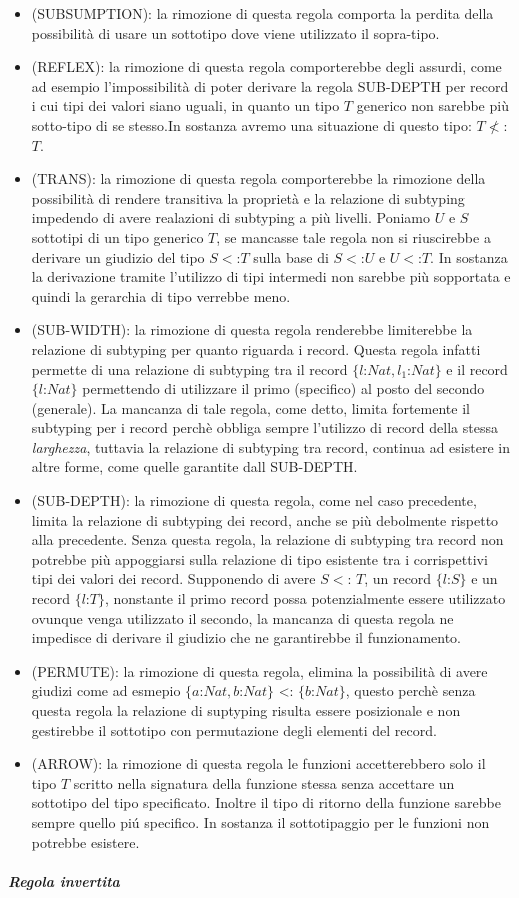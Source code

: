 \begin{itemize}
\item (SUBSUMPTION): la rimozione di questa regola comporta la perdita della possibilit\`a di usare un sottotipo dove viene utilizzato il sopra-tipo.
\item (REFLEX): la rimozione di questa regola comporterebbe degli assurdi, come ad esempio l'impossibilit\`a di poter derivare la regola SUB-DEPTH per record i cui tipi dei valori siano uguali, in quanto un tipo $T$ generico non sarebbe pi\`u sotto-tipo di se stesso.In sostanza avremo una situazione di questo tipo: $T \not <$: $T$.
\item (TRANS):  la rimozione di questa regola comporterebbe la rimozione della possibilit\`a di rendere transitiva la propriet\`a e la relazione di subtyping impedendo di avere realazioni di subtyping a pi\`u livelli. Poniamo $U$ e $S$ sottotipi di un tipo generico $T$, se mancasse tale regola non si riuscirebbe a derivare un giudizio del tipo $S<$:$T$ sulla base di $S <$:$U$ e $U<$:$T$. In sostanza la derivazione tramite l'utilizzo di tipi intermedi non sarebbe pi\`u sopportata e quindi la gerarchia di tipo verrebbe meno.
\item (SUB-WIDTH):
la rimozione di questa regola renderebbe limiterebbe la relazione di subtyping per quanto riguarda i record. Questa regola infatti permette di una relazione di subtyping tra il record $\{l$:$Nat,l_1$:$Nat\}$ e il record $\{l$:$Nat\}$ permettendo di utilizzare il primo (specifico) al posto del secondo (generale). La mancanza di tale regola, come detto, limita fortemente il subtyping per i record perch\`e obbliga sempre l'utilizzo di record della stessa \emph{larghezza}, tuttavia la relazione di subtyping tra record, continua ad esistere in altre forme, come quelle garantite dall SUB-DEPTH.
\item (SUB-DEPTH): 
la rimozione di questa regola, come nel caso precedente, limita la relazione di subtyping dei record, anche se pi\`u debolmente rispetto alla precedente. Senza questa regola, la relazione di subtyping tra record non potrebbe pi\`u appoggiarsi sulla relazione di tipo esistente tra i corrispettivi tipi dei valori dei record. Supponendo di avere $S <$: $T$, un record   $\{l$:$S\}$ e un record $\{l$:$T\}$, nonstante il primo record possa potenzialmente essere utilizzato ovunque venga utilizzato il secondo, la mancanza di questa regola ne impedisce di derivare il giudizio che ne garantirebbe il funzionamento.
\item (PERMUTE):
la rimozione di questa regola, elimina la possibilit\`a di avere giudizi come ad esmepio $\{a$:$Nat,b$:$Nat\}$ <: $\{b$:$Nat\}$, questo perch\`e senza questa regola la relazione di suptyping risulta essere posizionale e non gestirebbe il sottotipo con permutazione degli elementi del record.
\item (ARROW):
la rimozione di questa regola le funzioni accetterebbero solo il tipo $T$ scritto nella signatura della funzione stessa senza accettare un sottotipo del tipo specificato. Inoltre il tipo di ritorno della funzione sarebbe sempre quello pi\'u specifico. In sostanza il sottotipaggio per le funzioni non potrebbe esistere.
\end{itemize}
\subparagraph*{Regola invertita}

